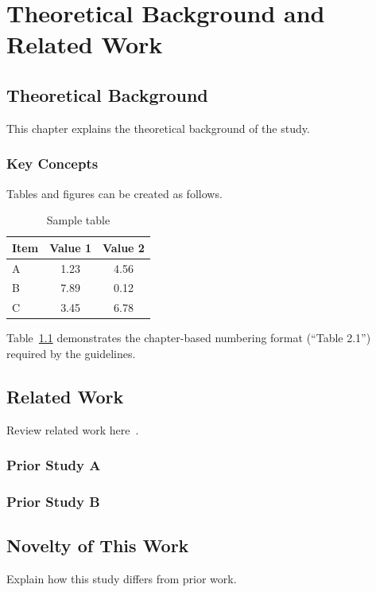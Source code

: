\chapter{Theoretical Background and Related Work}
\label{ch:background}

\section{Theoretical Background}

This chapter explains the theoretical background of the study.

\subsection{Key Concepts}

Tables and figures can be created as follows.

\begin{table}[h]
  \centering
  \caption{Sample table}
  \label{tab:sample}
  \begin{tabular}{lcc}
    \toprule
    Item & Value 1 & Value 2 \\
    \midrule
    A & 1.23 & 4.56 \\
    B & 7.89 & 0.12 \\
    C & 3.45 & 6.78 \\
    \bottomrule
  \end{tabular}
\end{table}

Table~\ref{tab:sample} demonstrates the chapter-based numbering format
(``Table 2.1'') required by the guidelines.

\section{Related Work}

Review related work here~\cite{sample2026}.

\subsection{Prior Study A}

\subsection{Prior Study B}

\section{Novelty of This Work}

Explain how this study differs from prior work.
